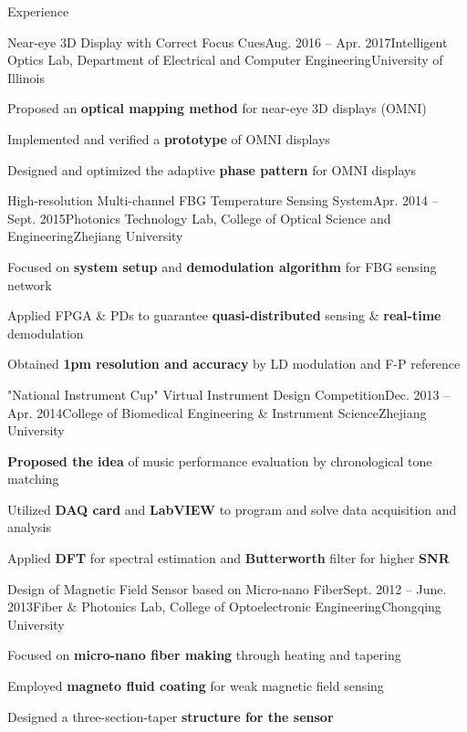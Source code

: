 \documentclass{resume} %
\begin{document}
	\begin{rSection}{Experience}
		
		\begin{rSubsection}{Near-eye 3D Display with Correct Focus Cues}{Aug. 2016 -- Apr. 2017}{Intelligent Optics Lab, Department of Electrical and Computer Engineering}{University of Illinois}
			\item Proposed an \textbf{optical mapping method} for near-eye 3D displays (OMNI)
			\item Implemented and verified a \textbf{prototype} of OMNI displays
			\item Designed and optimized the adaptive \textbf{phase pattern} for OMNI displays
		\end{rSubsection}
		
		\begin{rSubsection}{High-resolution Multi-channel FBG Temperature Sensing System}{Apr. 2014 -- Sept. 2015}{Photonics Technology Lab, College of Optical Science and Engineering}{Zhejiang University}
			\item Focused on \textbf{system setup} and \textbf{demodulation algorithm} for FBG sensing network
			\item Applied FPGA \& PDs to guarantee \textbf{quasi-distributed} sensing \& \textbf{real-time} demodulation
			\item Obtained \textbf{1pm resolution and accuracy} by LD modulation and F-P reference
		\end{rSubsection}
		
		\begin{rSubsection}{"National Instrument Cup" Virtual Instrument Design Competition}{Dec. 2013 -- Apr. 2014}{College of Biomedical Engineering \& Instrument Science}{Zhejiang University}
			\item \textbf{Proposed the idea} of music performance evaluation by chronological tone matching
			\item Utilized \textbf{DAQ card} and \textbf{LabVIEW} to program and solve data acquisition and analysis
			\item Applied \textbf{DFT} for spectral estimation and \textbf{Butterworth} filter for higher \textbf{SNR}
		\end{rSubsection}
		
		\begin{rSubsection}{Design of Magnetic Field Sensor based on Micro-nano Fiber}{Sept. 2012 -- June. 2013}{Fiber \& Photonics Lab, College of Optoelectronic Engineering}{Chongqing University}
			\item Focused on \textbf{micro-nano fiber making} through heating and tapering
			\item Employed \textbf{magneto fluid coating} for weak magnetic field sensing
			\item Designed a three-section-taper \textbf{structure for the sensor}
		\end{rSubsection}
		

\end{rSection}
\end{document}
